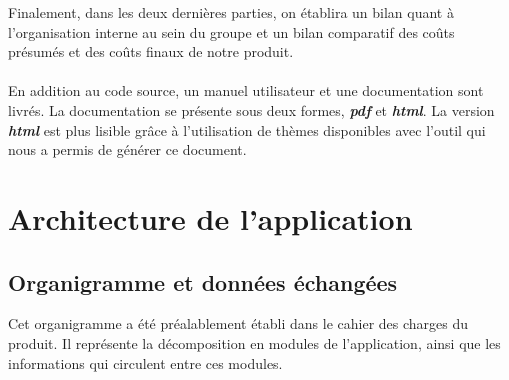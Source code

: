 	Finalement, dans les deux dernières parties, on établira un bilan quant à l'organisation interne au sein du groupe et un bilan comparatif des coûts présumés et des coûts finaux de notre produit.
	
	\paragraph{}En addition au code source, un manuel utilisateur et une documentation sont livrés. La documentation se présente sous deux formes, \textit{\textbf{pdf}} et \textit{\textbf{html}}. La version \textit{\textbf{html}} est plus lisible grâce à l'utilisation de thèmes disponibles avec l'outil qui nous a permis de générer ce document.
	
	\section{Architecture de l'application}
		\subsection{Organigramme et données échangées}
		Cet organigramme a été préalablement établi dans le cahier des charges du produit. Il représente la décomposition en modules de l'application, ainsi que les informations qui circulent entre ces modules.
		

